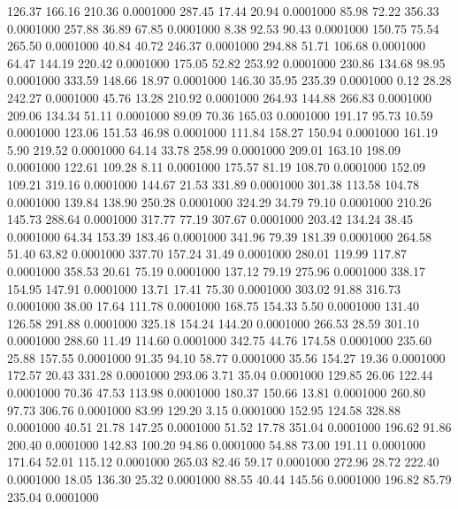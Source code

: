  126.37  166.16  210.36   0.0001000
 287.45   17.44   20.94   0.0001000
  85.98   72.22  356.33   0.0001000
 257.88   36.89   67.85   0.0001000
   8.38   92.53   90.43   0.0001000
 150.75   75.54  265.50   0.0001000
  40.84   40.72  246.37   0.0001000
 294.88   51.71  106.68   0.0001000
  64.47  144.19  220.42   0.0001000
 175.05   52.82  253.92   0.0001000
 230.86  134.68   98.95   0.0001000
 333.59  148.66   18.97   0.0001000
 146.30   35.95  235.39   0.0001000
   0.12   28.28  242.27   0.0001000
  45.76   13.28  210.92   0.0001000
 264.93  144.88  266.83   0.0001000
 209.06  134.34   51.11   0.0001000
  89.09   70.36  165.03   0.0001000
 191.17   95.73   10.59   0.0001000
 123.06  151.53   46.98   0.0001000
 111.84  158.27  150.94   0.0001000
 161.19    5.90  219.52   0.0001000
  64.14   33.78  258.99   0.0001000
 209.01  163.10  198.09   0.0001000
 122.61  109.28    8.11   0.0001000
 175.57   81.19  108.70   0.0001000
 152.09  109.21  319.16   0.0001000
 144.67   21.53  331.89   0.0001000
 301.38  113.58  104.78   0.0001000
 139.84  138.90  250.28   0.0001000
 324.29   34.79   79.10   0.0001000
 210.26  145.73  288.64   0.0001000
 317.77   77.19  307.67   0.0001000
 203.42  134.24   38.45   0.0001000
  64.34  153.39  183.46   0.0001000
 341.96   79.39  181.39   0.0001000
 264.58   51.40   63.82   0.0001000
 337.70  157.24   31.49   0.0001000
 280.01  119.99  117.87   0.0001000
 358.53   20.61   75.19   0.0001000
 137.12   79.19  275.96   0.0001000
 338.17  154.95  147.91   0.0001000
  13.71   17.41   75.30   0.0001000
 303.02   91.88  316.73   0.0001000
  38.00   17.64  111.78   0.0001000
 168.75  154.33    5.50   0.0001000
 131.40  126.58  291.88   0.0001000
 325.18  154.24  144.20   0.0001000
 266.53   28.59  301.10   0.0001000
 288.60   11.49  114.60   0.0001000
 342.75   44.76  174.58   0.0001000
 235.60   25.88  157.55   0.0001000
  91.35   94.10   58.77   0.0001000
  35.56  154.27   19.36   0.0001000
 172.57   20.43  331.28   0.0001000
 293.06    3.71   35.04   0.0001000
 129.85   26.06  122.44   0.0001000
  70.36   47.53  113.98   0.0001000
 180.37  150.66   13.81   0.0001000
 260.80   97.73  306.76   0.0001000
  83.99  129.20    3.15   0.0001000
 152.95  124.58  328.88   0.0001000
  40.51   21.78  147.25   0.0001000
  51.52   17.78  351.04   0.0001000
 196.62   91.86  200.40   0.0001000
 142.83  100.20   94.86   0.0001000
  54.88   73.00  191.11   0.0001000
 171.64   52.01  115.12   0.0001000
 265.03   82.46   59.17   0.0001000
 272.96   28.72  222.40   0.0001000
  18.05  136.30   25.32   0.0001000
  88.55   40.44  145.56   0.0001000
 196.82   85.79  235.04   0.0001000
